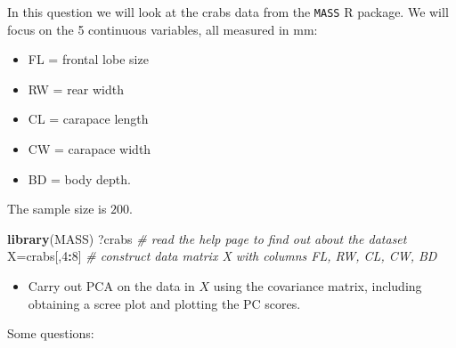 \documentclass[]{book}
\newenvironment{Shaded}{\begin{snugshade}}{\end{snugshade}}
\newcommand{\CommentTok}[1]{\textcolor[rgb]{0.56,0.35,0.01}{\textit{#1}}}
\newcommand{\DecValTok}[1]{\textcolor[rgb]{0.00,0.00,0.81}{#1}}
\newcommand{\KeywordTok}[1]{\textcolor[rgb]{0.13,0.29,0.53}{\textbf{#1}}}
\newcommand{\NormalTok}[1]{#1}
\newcommand{\OperatorTok}[1]{\textcolor[rgb]{0.81,0.36,0.00}{\textbf{#1}}}
\providecommand{\tightlist}{%
  \setlength{\itemsep}{0pt}\setlength{\parskip}{0pt}}
\theoremstyle{definition}
\theoremstyle{definition}
\theoremstyle{definition}
\theoremstyle{remark}
\begin{document}
In this question we will look at the crabs data from the \texttt{MASS} R package.
We will focus on the 5 continuous variables, all measured in mm:

\begin{itemize}
\tightlist
\item
  FL = frontal lobe size
\item
  RW = rear width
\item
  CL = carapace length
\item
  CW = carapace width
\item
  BD = body depth.
\end{itemize}

The sample size is \(200\).

\begin{Shaded}
\begin{Highlighting}[]
\KeywordTok{library}\NormalTok{(MASS)}
\NormalTok{?crabs }\CommentTok{# read the help page to find out about the dataset}
\NormalTok{X=crabs[,}\DecValTok{4}\OperatorTok{:}\DecValTok{8}\NormalTok{]     }\CommentTok{# construct data matrix X with columns FL, RW, CL, CW, BD}
\end{Highlighting}
\end{Shaded}

\begin{itemize}
\tightlist
\item
  Carry out PCA on the data in \(X\) using the covariance matrix, including obtaining a scree plot and plotting the PC scores.
\end{itemize}

Some questions:
\end{document}
